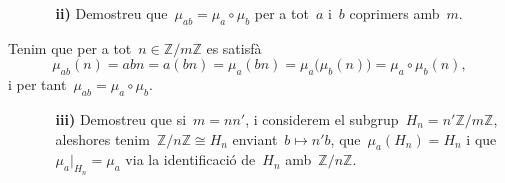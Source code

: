 \documentclass[a4paper]{article}
\newcommand{\ZZ}{\mathbb{Z}}
\begin{document}
\begin{enumerate}
    \item[] \begin{enumerate}
        \item[\textbf{ii)}] Demostreu que~\(\mu_{ab} = \mu_{a}\circ\mu_{b}\) per
            a tot~\(a\) i~\(b\) coprimers amb~\(m\).
    \end{enumerate}
\end{enumerate}

Tenim que per a tot~\(n\in\ZZ/m\ZZ\) es satisfà
\[
    \mu_{ab}(n)
    = abn
    = a(bn)
    = \mu_{a}(bn)
    = \mu_{a}\bigl(\mu_{b}(n)\bigr)
    = \mu_{a}\circ\mu_{b}(n),
\]
i per tant~\(\mu_{ab} = \mu_{a}\circ\mu_{b}\).

\begin{enumerate}
    \item[] \begin{enumerate}
        \item[\textbf{iii)}] Demostreu que si~\(m=nn'\),
            i considerem el subgrup~\(H_{n}=n'\ZZ/m\ZZ\),
            aleshores tenim~\(\ZZ/n\ZZ \cong H_{n}\)
            enviant~\(b\mapsto n'b\),
            que~\(\mu_{a}(H_{n})=H_{n}\)
            i que~\(\mu_{a}\rvert_{H_{n}}=\mu_{a}\)
            via la identificació de~\(H_{n}\)
            amb~\(\ZZ/n\ZZ\).
    \end{enumerate}
\end{enumerate}
\end{document}
